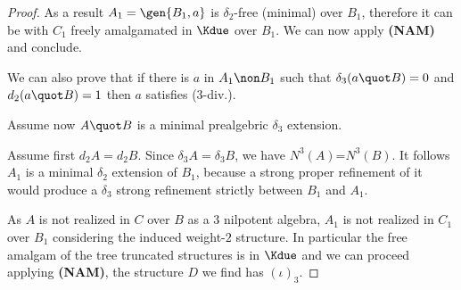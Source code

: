 \begin{proof}
As a result $A_{1}=\gen{B_{1},a}$ is $\delta_{2}$-free (minimal) over $B_{1}$, therefore it can be with $C_{1}$
freely amalgamated in $\Kdue$ over $B_{1}$. We can now apply {\bf (NAM)} and conclude.


We can also prove that if there is $a$ in $A_{1}\non B_{1}$ such that $\delta_{3}(a\quot B)=0$
and $d_{2}(a\quot B)=1$ then $a$ satisfies ($3$-div.).

\medskip
Assume now $A\quot B$ is a minimal prealgebric $\delta_{3}$ extension.

Assume first $d_{2}A=d_{2}B$. Since $\delta_{3}A=\delta_{3}B$, we have $N^{3}(A)$=$N^{3}(B)$.
It follows $A_{1}$ is a minimal $\delta_{2}$ extension of $B_{1}$, because a strong proper refinement of it
would produce a $\delta_{3}$ strong refinement strictly between $B_{1}$ and $A_{1}$.

As $A$ is not realized in $C$ over $B$ as a $3$ nilpotent algebra, $A_{1}$ is not realized
in $C_{1}$ over $B_{1}$ considering the induced weight-$2$ structure.
In particular the free amalgam of the tree truncated structures is in $\Kdue$ and we can
proceed applying {\bf (NAM)}, the structure $D$ we find has $(\iota)_{3}$.


\end{proof}
